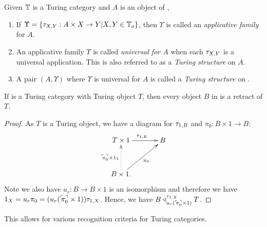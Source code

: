 \begin{definition}\label{def:turing_structure}
  Given $\mathbb{T}$ is a Turing category and $A$ is an object of \T,
  \begin{enumerate}[{(}i{)}]
    \item If $\Upsilon=\{\tau_{{X},{Y}}: A\times X \to Y | X,Y \in \mathbb{T}_o\}$, then $\Upsilon$ is called an
      \emph{applicative family} for $A$.
    \item An applicative family $\Upsilon$ is called \emph{universal for $A$} when each $\tau_{{X},{Y}}$ is
      a universal application. This is also referred to as a \emph{Turing structure} on $A$.
    \item A pair $(A,\Upsilon)$ where $\Upsilon$ is universal for $A$ is called a \emph{Turing
      structure} on \T.
  \end{enumerate}
\end{definition}

\begin{lemma}\label{lem:turing_object_is_retractable}
  If \T is a Turing category with Turing object $T$, then every object $B$ in \T is a retract of
  $T$.
\end{lemma}
\begin{proof}
  As $T$ is a Turing object, we have a diagram for $\tau_{{1},{B}}$ and $\pi_0:B\times 1 \to B$:
  \[
    \xymatrix@C+10pt@R+10pt{
      T\times 1 \ar[r]^{\tur{1}{B}} & B \\
      B\times 1. \ar@{.>}[u]^{\name{\pi_0}\times 1_1} \ar[ur]_{\pi_0}
    }
  \]
  Note we also have $u_r:B\to B\times 1$ is an
  isomorphism and therefore we have $1_X = u_r \pi_0 = (u_r ({}^\ulcorner\!\!\pi_0^\urcorner\times 1)) \tau_{{1},{X}}$. Hence, we
  have $B \triangleleft_{u_r ({}^\ulcorner\!\!\pi_0^\urcorner\times 1)}^{\tau_{{1},{X}}} T$.
\end{proof}

This allows for various recognition criteria for Turing categories.

